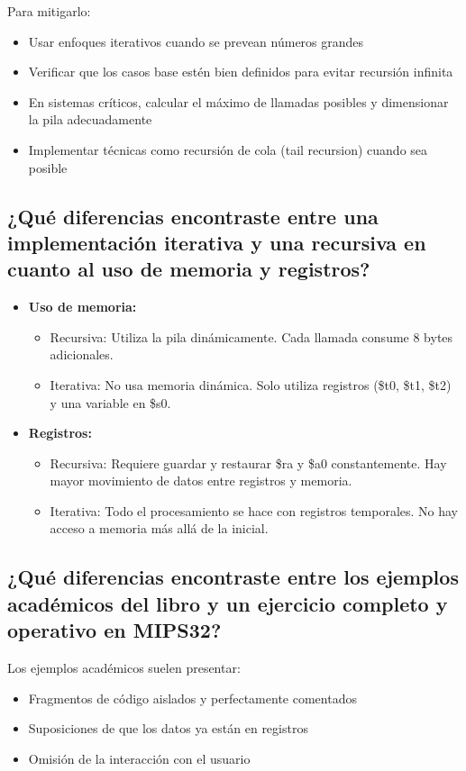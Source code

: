 \documentclass[12pt]{article}
\begin{document}
	Para mitigarlo:
	\begin{itemize}
		\item Usar enfoques iterativos cuando se prevean números grandes
		\item Verificar que los casos base estén bien definidos para evitar recursión infinita
		\item En sistemas críticos, calcular el máximo de llamadas posibles y dimensionar la pila adecuadamente
		\item Implementar técnicas como recursión de cola (tail recursion) cuando sea posible
	\end{itemize}
	
	\subsection{¿Qué diferencias encontraste entre una implementación iterativa y una recursiva en cuanto al uso de memoria y registros?}
	\begin{itemize}
		\item \textbf{Uso de memoria:} 
		\begin{itemize}
			\item Recursiva: Utiliza la pila dinámicamente. Cada llamada consume 8 bytes adicionales.
			\item Iterativa: No usa memoria dinámica. Solo utiliza registros (\$t0, \$t1, \$t2) y una variable en \$s0.
		\end{itemize}
		\item \textbf{Registros:}
		\begin{itemize}
			\item Recursiva: Requiere guardar y restaurar \$ra y \$a0 constantemente. Hay mayor movimiento de datos entre registros y memoria.
			\item Iterativa: Todo el procesamiento se hace con registros temporales. No hay acceso a memoria más allá de la inicial.
		\end{itemize}
	\end{itemize}
	
	\subsection{¿Qué diferencias encontraste entre los ejemplos académicos del libro y un ejercicio completo y operativo en MIPS32?}
	Los ejemplos académicos suelen presentar:
	\begin{itemize}
		\item Fragmentos de código aislados y perfectamente comentados
		\item Suposiciones de que los datos ya están en registros
		\item Omisión de la interacción con el usuario
	\end{itemize}
	
\end{document}
